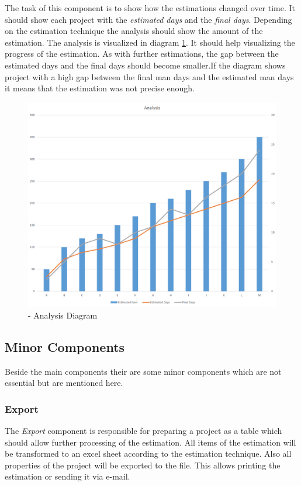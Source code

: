 The task of this component is to show how the estimations changed over time. It should show each project with the \textit{estimated days} and the \textit{final days}. Depending on the estimation technique the analysis should show the amount of the estimation. The analysis is visualized in diagram \ref{fig:analysis}. It should help visualizing the progress of the estimation. As with further estimations, the gap between the estimated days and the final days should become smaller.If the diagram shows project with a high gap between the final man days and the estimated man days it means that the estimation was not precise enough.
\begin{figure}[h] 
	\centering 
	\includegraphics[width=12cm]{images/analysis.png} 
	\caption{- Analysis Diagram} 
	\label{fig:analysis}
\end{figure}

\subsection{Minor Components}

Beside the main components their are some minor components which are not essential but are mentioned here.

\subsubsection{\textbf{Export}}

The \textit{Export} component is responsible for preparing a project as a table which should allow further processing of the estimation. All items of the estimation will be transformed to an excel sheet according to the estimation technique. Also all properties of the project will be exported to the file. This allows printing the estimation or sending it via e-mail.

